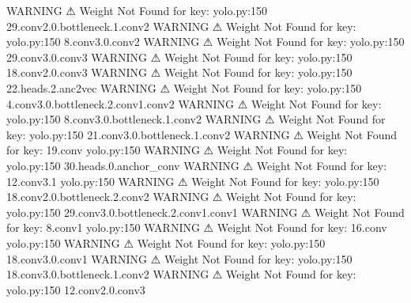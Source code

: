                     WARNING  ⚠ Weight Not Found for key:               yolo.py:150
                             29.conv2.0.bottleneck.1.conv2                        
                    WARNING  ⚠ Weight Not Found for key:               yolo.py:150
                             8.conv3.0.conv2                                      
                    WARNING  ⚠ Weight Not Found for key:               yolo.py:150
                             29.conv3.0.conv3                                     
                    WARNING  ⚠ Weight Not Found for key:               yolo.py:150
                             18.conv2.0.conv3                                     
                    WARNING  ⚠ Weight Not Found for key:               yolo.py:150
                             22.heads.2.anc2vec                                   
                    WARNING  ⚠ Weight Not Found for key:               yolo.py:150
                             4.conv3.0.bottleneck.2.conv1.conv2                   
                    WARNING  ⚠ Weight Not Found for key:               yolo.py:150
                             8.conv3.0.bottleneck.1.conv2                         
                    WARNING  ⚠ Weight Not Found for key:               yolo.py:150
                             21.conv3.0.bottleneck.1.conv2                        
                    WARNING  ⚠ Weight Not Found for key: 19.conv       yolo.py:150
                    WARNING  ⚠ Weight Not Found for key:               yolo.py:150
                             30.heads.0.anchor_conv                               
                    WARNING  ⚠ Weight Not Found for key: 12.conv3.1    yolo.py:150
                    WARNING  ⚠ Weight Not Found for key:               yolo.py:150
                             18.conv2.0.bottleneck.2.conv2                        
                    WARNING  ⚠ Weight Not Found for key:               yolo.py:150
                             29.conv3.0.bottleneck.2.conv1.conv1                  
                    WARNING  ⚠ Weight Not Found for key: 8.conv1       yolo.py:150
                    WARNING  ⚠ Weight Not Found for key: 16.conv       yolo.py:150
                    WARNING  ⚠ Weight Not Found for key:               yolo.py:150
                             18.conv3.0.conv1                                     
                    WARNING  ⚠ Weight Not Found for key:               yolo.py:150
                             18.conv3.0.bottleneck.1.conv2                        
                    WARNING  ⚠ Weight Not Found for key:               yolo.py:150
                             12.conv2.0.conv3                                     
